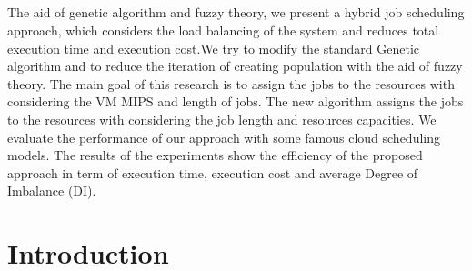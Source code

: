 \documentclass[a4paper,12pt]{report}
\let\origdoublepage\cleardoublepage
\renewcommand{\cleardoublepage}{%
	\clearpage
	{\pagestyle{empty}\origdoublepage}%
}
\begin{document}
	\paragraph{}
	\onehalfspacing
	{}
The aid of genetic algorithm and fuzzy theory, we present a hybrid job scheduling approach, which considers the load balancing of the system and reduces total execution time and execution cost.We try to modify the standard Genetic algorithm and to reduce the iteration of creating population with the aid of fuzzy theory. The main goal of this research is to assign the jobs to the resources with considering the VM MIPS and length of jobs. The new algorithm assigns the jobs to the resources with considering the job length and resources capacities. We evaluate the performance of our approach with some famous cloud scheduling models. The results of the experiments show the efficiency of the proposed approach in term of execution time, execution cost and average Degree of Imbalance (DI).



	
	
\chapter{Introduction}
\pagestyle{fancy}
\rfoot{ \thepage}
\cfoot{ }
\renewcommand{\headrulewidth}{2pt}
\renewcommand{\footrulewidth}{1pt}
\patchcmd{\chapter}
{\clearpage}
{\cleardoublepage}
\end{document}
